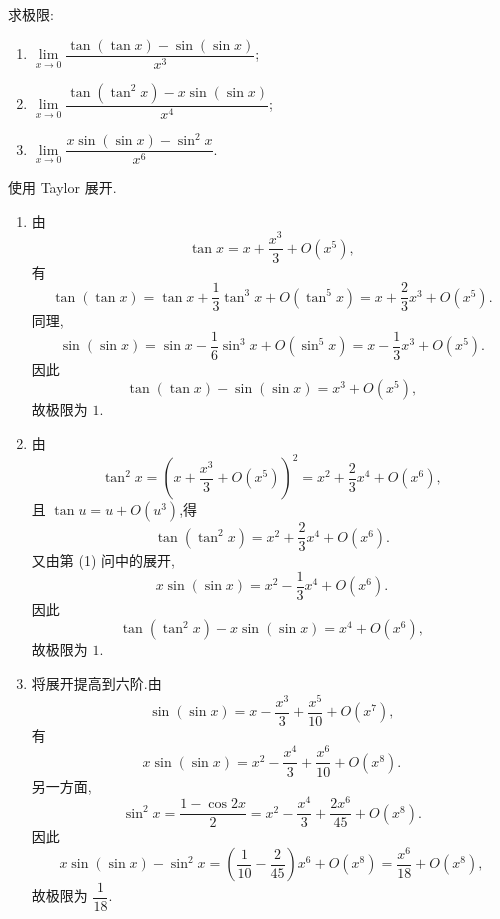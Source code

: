 \begin{example}
    求极限:
    \begin{enumerate}
        \item $\displaystyle
                  \lim\limits_{x\to0}
                  \dfrac{\tan(\tan x)-\sin(\sin x)}{x^3}$;
        \item $\displaystyle
                  \lim\limits_{x\to0}
                  \dfrac{\tan(\tan^2x)-x\sin(\sin x)}{x^4}$;
        \item $\displaystyle
                  \lim\limits_{x\to0}
                  \dfrac{x\sin(\sin x)-\sin^2x}{x^6}$.
    \end{enumerate}
\end{example}
\exampleblank

\begin{solution}
    使用 Taylor 展开.
    \begin{enumerate}
        \item 由
              \[
                  \tan x=x+\dfrac{x^3}{3}+O(x^5),
              \]
              有
              \[
                  \tan(\tan x) = \tan x+\dfrac{1}{3}\tan^3x+O(\tan^5x) = x+\dfrac{2}{3}x^3+O(x^5).
              \]
              同理,
              \[
                  \sin(\sin x) = \sin x-\dfrac{1}{6}\sin^3x+O(\sin^5x) = x-\dfrac{1}{3}x^3+O(x^5).
              \]
              因此
              \[
                  \tan(\tan x)-\sin(\sin x)
                  =x^3+O(x^5),
              \]
              故极限为 $1$.
        \item 由
              \[
                  \tan^2x
                  =\left(x+\dfrac{x^3}{3}+O(x^5)\right)^2
                  =x^2+\dfrac{2}{3}x^4+O(x^6),
              \]
              且 $\tan u=u+O(u^3)$,得
              \[
                  \tan(\tan^2x)
                  =x^2+\dfrac{2}{3}x^4+O(x^6).
              \]
              又由第 (1) 问中的展开,
              \[
                  x\sin(\sin x)
                  =x^2-\dfrac{1}{3}x^4+O(x^6).
              \]
              因此
              \[
                  \tan(\tan^2x)-x\sin(\sin x)
                  =x^4+O(x^6),
              \]
              故极限为 $1$.
        \item 将展开提高到六阶.由
              \[
                  \sin(\sin x)
                  =x-\dfrac{x^3}{3}+\dfrac{x^5}{10}+O(x^7),
              \]
              有
              \[
                  x\sin(\sin x)
                  =x^2-\dfrac{x^4}{3}+\dfrac{x^6}{10}+O(x^8).
              \]
              另一方面,
              \[
                  \sin^2x
                  =\dfrac{1-\cos2x}{2}
                  =x^2-\dfrac{x^4}{3}+\dfrac{2x^6}{45}+O(x^8).
              \]
              因此
              \[
                  x\sin(\sin x)-\sin^2x
                  =
                  \left(\dfrac{1}{10}-\dfrac{2}{45}\right)x^6
                  +O(x^8)
                  =
                  \dfrac{x^6}{18}+O(x^8),
              \]
              故极限为 $\dfrac{1}{18}$.
    \end{enumerate}
\end{solution}

